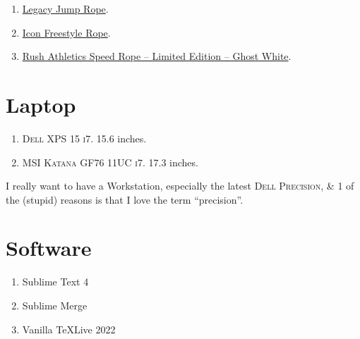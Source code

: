 \documentclass[oneside]{book}
\numberwithin{equation}{section}
\begin{document}
\begin{enumerate}
	\item \href{https://www.rushathletics.co.uk/collections/ropes/products/legacy-jump-rope}{Legacy Jump Rope}.
	\item \href{https://www.rushathletics.co.uk/collections/ropes/products/icon-freestyle-rope}{Icon Freestyle Rope}.
	\item \href{https://www.rushathletics.co.uk/collections/ropes/products/rush-athletics-speed-rope-ghost-white}{Rush Athletics Speed Rope -- Limited Edition -- Ghost White}.
\end{enumerate}

\section{Laptop}

\begin{enumerate}
	\item \textsc{Dell XPS 15 i7.} 15.6 inches.
	\item \textsc{MSI Katana GF76 11UC i7.} 17.3 inches.
\end{enumerate}
I really want to have a Workstation, especially the latest \textsc{Dell Precision}, \& 1 of the (stupid) reasons is that I love the term ``precision''.

\section{Software}

\begin{enumerate}
	\item Sublime Text 4
	\item Sublime Merge
	\item Vanilla \TeX Live 2022
\end{enumerate}


\printbibliography[heading=bibintoc]
\end{document}

